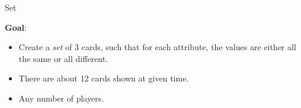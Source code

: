 \documentclass{beamer}
\begin{document}
\begin{frame}[t]{Set}

\textbf{Goal}:
\begin{itemize}
 \item Create a \emph{set} of 3 cards, such that for each attribute, the values are either all the same or all different.
 \item<3-> There are about 12 cards shown at given time.
 \item<3-> Any number of players.
\end{itemize}

\begin{figure}
\centering 
{}
\end{figure}

\end{frame}
\end{document}
